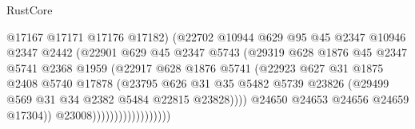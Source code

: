 \begin{lexlean}{RustCore}
\begin{coremodule}
                                        @17167
                                        @17171
                                        @17176
                                        @17182)
                                      (@22702
                                        @10944
                                        @629
                                        @95
                                        @45
                                        @2347
                                        @10946
                                        @2347
                                        @2442
                                        (@22901
                                          @629
                                          @45
                                          @2347
                                          @5743
                                          (@29319
                                            @628
                                            @1876
                                            @45
                                            @2347
                                            @5741
                                            @2368
                                            @1959
                                            (@22917
                                              @628
                                              @1876
                                              @5741
                                              (@22923
                                                @627
                                                @31
                                                @1875
                                                @2408
                                                @5740
                                                @17878
                                                (@23795
                                                  @626
                                                  @31
                                                  @35
                                                  @5482
                                                  @5739
                                                  @23826
                                                  (@29499 @569 @31 @34 @2382 @5484 @22815 @23828))))
                                            @24650
                                            @24653
                                            @24656
                                            @24659
                                            @17304))
                                        @23008))))))))))))))))))

\end{coremodule}
\end{lexlean}
